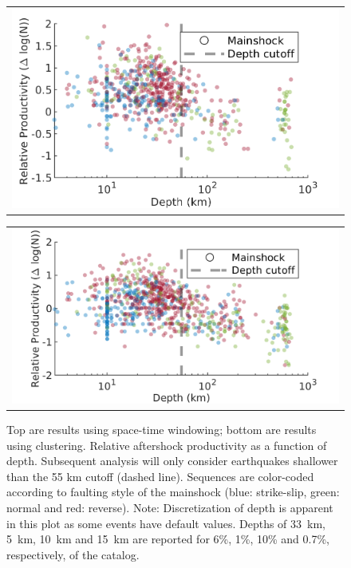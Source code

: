 \documentclass[draft]{agujournal}
\begin{document}
\newpage
\begin{figure}[H]
    \centering
    \begin{tabular}{@{}c@{}}
        \includegraphics{figures/prod_vs_depth.png}
    \end{tabular}
    
    \begin{tabular}{@{}c@{}}
        \includegraphics{figures/prod_vs_depth_z2008.png}
    \end{tabular}
    
    \caption{Top are results using space-time windowing; bottom are results using \citet{Zaliapin2008} clustering. Relative aftershock productivity as a function of depth. Subsequent analysis will only consider earthquakes shallower than the 55 km cutoff (dashed line). Sequences are color-coded according to faulting style of the mainshock (blue: strike-slip, green: normal and red: reverse). Note: Discretization of depth is apparent in this plot as some events have default values. Depths of  33~km, 5~km, 10~km and 15~km are reported for  6\%, 1\%, 10\% and 0.7\%, respectively, of the catalog.}
\end{figure}
\end{document}
